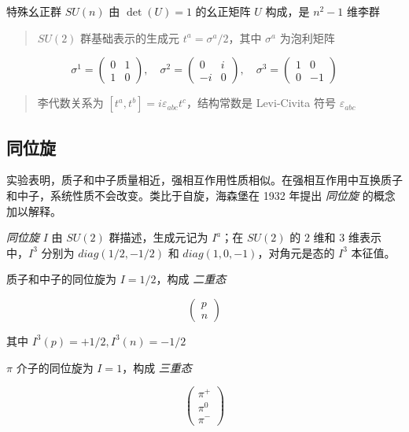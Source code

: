 \documentclass[oneside,a4paper,openany,11pt]{ctexbook}
\begin{document}
特殊幺正群 $SU(n)$ 由 $\det(U)=1$ 的幺正矩阵 $U$ 构成，是 $n^2 - 1$ 维李群

\begin{quote}
    $SU(2)$ 群基础表示的生成元 $t^a=\sigma^a/2$，其中 $\sigma^a$ 为泡利矩阵
\end{quote}

\begin{equation}
    \sigma^1 =
\begin{pmatrix}
    0 & 1 \\
    1 & 0
\end{pmatrix}, \quad
\sigma^2 =
\begin{pmatrix}
    0 & i \\
    -i & 0
\end{pmatrix}, \quad
\sigma^3 =
\begin{pmatrix}
    1 & 0 \\
    0 & -1
\end{pmatrix}
\end{equation}

\begin{quote}
    李代数关系为 $[t^a, t^b]=i \varepsilon_{abc} t^c$，结构常数是 Levi-Civita 符号 $\varepsilon_{abc}$
\end{quote}

\subsection{同位旋}

实验表明，质子和中子质量相近，强相互作用性质相似。在强相互作用中互换质子和中子，系统性质不会改变。类比于自旋，海森堡在 1932 年提出 \emph{同位旋} 的概念加以解释。

\emph{同位旋} $I$ 由 $SU(2)$ 群描述，生成元记为 $I^a$；在 $SU(2)$ 的 $2$ 维和 $3$ 维表示中，$I^3$ 分别为 $diag(1/2, -1/2)$ 和 $diag(1, 0, -1)$，对角元是态的 $I^3$ 本征值。

质子和中子的同位旋为 $I=1/2$，构成 \emph{二重态}

\begin{equation}
    \begin{pmatrix}
        p \\
        n
    \end{pmatrix}
\end{equation}

其中 $I^3(p)=+1/2, I^3(n)=-1/2$

$\pi$ 介子的同位旋为 $I=1$，构成 \emph{三重态}

\begin{equation}
    \begin{pmatrix}
        \pi^+ \\
        \pi^0 \\
        \pi^-
    \end{pmatrix}
\end{equation}
\end{document}
